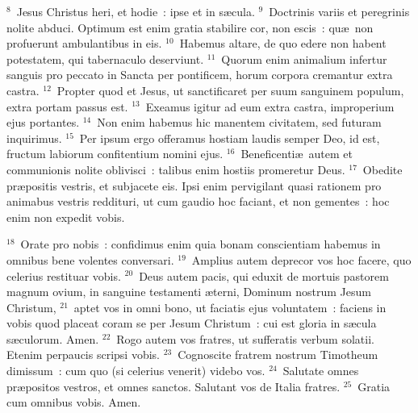 ${}^{8}$~Jesus Christus heri, et hodie~: ipse et in s\ae cula.
${}^{9}$~Doctrinis variis et peregrinis nolite abduci. Optimum est enim gratia stabilire cor, non escis~: qu\ae\ non profuerunt ambulantibus in eis.
${}^{10}$~Habemus altare, de quo edere non habent potestatem, qui tabernaculo deserviunt.
${}^{11}$~Quorum enim animalium infertur sanguis pro peccato in Sancta per pontificem, horum corpora cremantur extra castra.
${}^{12}$~Propter quod et Jesus, ut sanctificaret per suum sanguinem populum, extra portam passus est.
${}^{13}$~Exeamus igitur ad eum extra castra, improperium ejus portantes.
${}^{14}$~Non enim habemus hic manentem civitatem, sed futuram inquirimus.
${}^{15}$~Per ipsum ergo offeramus hostiam laudis semper Deo, id est, fructum labiorum confitentium nomini ejus.
${}^{16}$~Beneficenti\ae\ autem et communionis nolite oblivisci~: talibus enim hostiis promeretur Deus.
${}^{17}$~Obedite pr\ae positis vestris, et subjacete eis. Ipsi enim pervigilant quasi rationem pro animabus vestris reddituri, ut cum gaudio hoc faciant, et non gementes~: hoc enim non expedit vobis.


${}^{18}$~Orate pro nobis~: confidimus enim quia bonam conscientiam habemus in omnibus bene volentes conversari.
${}^{19}$~Amplius autem deprecor vos hoc facere, quo celerius restituar vobis.
${}^{20}$~Deus autem pacis, qui eduxit de mortuis pastorem magnum ovium, in sanguine testamenti \ae terni, Dominum nostrum Jesum Christum,
${}^{21}$~aptet vos in omni bono, ut faciatis ejus voluntatem~: faciens in vobis quod placeat coram se per Jesum Christum~: cui est gloria in s\ae cula s\ae culorum. Amen.
${}^{22}$~Rogo autem vos fratres, ut sufferatis verbum solatii. Etenim perpaucis scripsi vobis.
${}^{23}$~Cognoscite fratrem nostrum Timotheum dimissum~: cum quo (si celerius venerit) videbo vos.
${}^{24}$~Salutate omnes pr\ae positos vestros, et omnes sanctos. Salutant vos de Italia fratres.
${}^{25}$~Gratia cum omnibus vobis. Amen.
